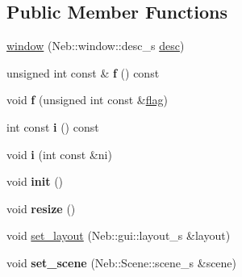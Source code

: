 \subsection*{\-Public \-Member \-Functions}
\begin{DoxyCompactItemize}
\item 
\hyperlink{classNeb_1_1window_1_1window_a04992828fdcd620216728e607654e26a}{window} (\-Neb\-::window\-::desc\-\_\-s \hyperlink{classNeb_1_1window_1_1desc}{desc})
\item 
\hypertarget{classNeb_1_1window_1_1window_a058f4e74584806be776f790606bea176}{unsigned int const \& {\bfseries f} () const }\label{classNeb_1_1window_1_1window_a058f4e74584806be776f790606bea176}

\item 
\hypertarget{classNeb_1_1window_1_1window_a7bd37e1175879f13e133ec69544b6415}{void {\bfseries f} (unsigned int const \&\hyperlink{structNeb_1_1window_1_1window_1_1flag}{flag})}\label{classNeb_1_1window_1_1window_a7bd37e1175879f13e133ec69544b6415}

\item 
\hypertarget{classNeb_1_1window_1_1window_a90425a3005c529708aaf54a2395e66e3}{int const {\bfseries i} () const }\label{classNeb_1_1window_1_1window_a90425a3005c529708aaf54a2395e66e3}

\item 
\hypertarget{classNeb_1_1window_1_1window_a1a518c5dba635be8cf80ef80e4ab9d12}{void {\bfseries i} (int const \&ni)}\label{classNeb_1_1window_1_1window_a1a518c5dba635be8cf80ef80e4ab9d12}

\item 
\hypertarget{classNeb_1_1window_1_1window_a724ec2bca092308d4fddac3c63383421}{void {\bfseries init} ()}\label{classNeb_1_1window_1_1window_a724ec2bca092308d4fddac3c63383421}

\item 
\hypertarget{classNeb_1_1window_1_1window_aaeeb16644f49f557d5216b13f7a71f39}{void {\bfseries resize} ()}\label{classNeb_1_1window_1_1window_aaeeb16644f49f557d5216b13f7a71f39}

\item 
void \hyperlink{classNeb_1_1window_1_1window_a9938baa74d5243bd58f2dd9a516d14e5}{set\-\_\-layout} (\-Neb\-::gui\-::layout\-\_\-s \&layout)
\item 
\hypertarget{classNeb_1_1window_1_1window_ae51c264fc1412e59f78696f16029ec9d}{void {\bfseries set\-\_\-scene} (\-Neb\-::\-Scene\-::scene\-\_\-s \&scene)}\label{classNeb_1_1window_1_1window_ae51c264fc1412e59f78696f16029ec9d}


\end{DoxyCompactItemize}
